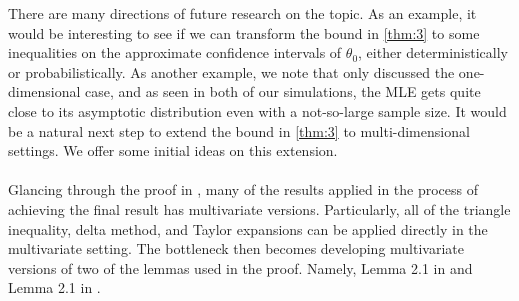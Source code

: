 There are many directions of future research on the topic. As an example, it would be interesting to see if we can transform the bound in \cref{thm:3} to some inequalities on the approximate confidence intervals of $\theta_0$, either deterministically or probabilistically. As another example, we note that \cite{anastasiou2015bounds} only discussed the one-dimensional case, and as seen in both of our simulations, the MLE gets quite close to its asymptotic distribution even with a not-so-large sample size. It would be a natural next step to extend the bound in \cref{thm:3} to multi-dimensional settings. We offer some initial ideas on this extension.\\\\
Glancing through the proof in \cite{anastasiou2015bounds}, many of the results applied in the process of achieving the final result has multivariate versions. Particularly, all of the triangle inequality, delta method, and Taylor expansions can be applied directly in the multivariate setting. The bottleneck then becomes developing multivariate versions of two of the lemmas used in the proof. Namely, Lemma 2.1 in \cite{anastasiou2015bounds} and Lemma 2.1 in \cite{anastasiou2017bounds}.